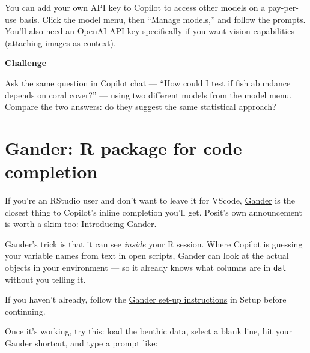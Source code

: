 \documentclass[
  letterpaper,
  DIV=11,
  numbers=noendperiod]{scrreprt}
\begin{document}
You can add your own API key to Copilot to access other models on a
pay-per-use basis. Click the model menu, then ``Manage models,'' and
follow the prompts. You'll also need an OpenAI API key specifically if
you want vision capabilities (attaching images as context).

\begin{tcolorbox}[enhanced jigsaw, toprule=.15mm, rightrule=.15mm, left=2mm, leftrule=.75mm, breakable, opacityback=0, arc=.35mm, colframe=quarto-callout-important-color-frame, bottomrule=.15mm, colback=white]
\begin{minipage}[t]{5.5mm}
\textcolor{quarto-callout-important-color}{\faExclamation}
\end{minipage}%
\begin{minipage}[t]{\textwidth - 5.5mm}

\vspace{-3mm}\textbf{Challenge}\vspace{3mm}

Ask the same question in Copilot chat --- ``How could I test if fish
abundance depends on coral cover?'' --- using two different models from
the model menu. Compare the two answers: do they suggest the same
statistical approach?

\end{minipage}%
\end{tcolorbox}

\chapter{Gander: R package for code
completion}\label{gander-r-package-for-code-completion}

If you're an RStudio user and don't want to leave it for VScode,
\href{https://simonpcouch.github.io/gander/articles/gander.html}{Gander}
is the closest thing to Copilot's inline completion you'll get. Posit's
own announcement is worth a skim too:
\href{https://posit.co/blog/introducing-gander/}{Introducing Gander}.

Gander's trick is that it can see \emph{inside} your R session. Where
Copilot is guessing your variable names from text in open scripts,
Gander can look at the actual objects in your environment --- so it
already knows what columns are in \texttt{dat} without you telling it.

If you haven't already, follow the \hyperref[sec-gander]{Gander set-up
instructions} in Setup before continuing.

Once it's working, try this: load the benthic data, select a blank line,
hit your Gander shortcut, and type a prompt like:
\end{document}
